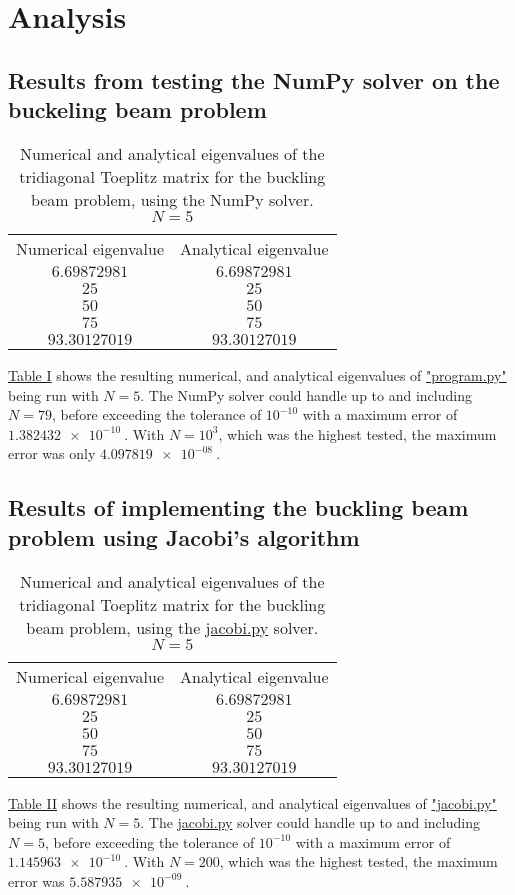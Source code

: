 \documentclass[english,notitlepage,reprint]{revtex4-1}  %
\begin{document}
\section{Analysis}\label{sec:4}
\subsection{Results from testing the NumPy solver on the buckeling beam problem}\label{subsec:41}
\begin{table}[H]
	\label{tab:411}
	\centering
	\begin{tabular}{|c|c|}
	Numerical eigenvalue & Analytical eigenvalue \\
	\(6.69872981\)	& \(6.69872981\) \\
	\(25\) & \(25\) \\
	\(50\) & \(50\) \\
	\(75\) & \(75\) \\
	\(93.30127019\) & \(93.30127019\) \\
	\end{tabular}
	\caption{Numerical and analytical eigenvalues of the tridiagonal Toeplitz matrix for
	the buckling beam problem, using the NumPy solver. \(N=5\)}
\end{table}

\hyperref[tab:411]{Table I} shows the resulting numerical, and analytical eigenvalues of \hyperref[A:1]{"program.py"} being run with \(N=5\). The NumPy solver could handle up to and including \(N=79\), before exceeding the tolerance of \(10^{-10}\) with a maximum error of \(\SI{1.382432e-10}{}\). With \(N=10^{3}\), which was the highest tested, the maximum error was only \(\SI{4.097819e-08}{}\).

\subsection{Results of implementing the buckling beam problem using Jacobi's algorithm}\label{subsec:42}
\begin{table}[H]
	\label{tab:421}
	\centering
	\begin{tabular}{|c|c|}
	Numerical eigenvalue & Analytical eigenvalue \\
	\(6.69872981\)	& \(6.69872981\) \\
	\(25\) & \(25\) \\
	\(50\) & \(50\) \\
	\(75\) & \(75\) \\
	\(93.30127019\) & \(93.30127019\) \\
	\end{tabular}
	\caption{Numerical and analytical eigenvalues of the tridiagonal Toeplitz matrix for
	the buckling beam problem, using the \hyperref[A:2]{jacobi.py} solver. \(N=5\)}
\end{table}
\hyperref[tab:421]{Table II} shows the resulting numerical, and analytical eigenvalues of \hyperref[A:2]{"jacobi.py"} being run with \(N=5\). The \hyperref[A:2]{jacobi.py} solver could handle up to and including \(N=5\), before exceeding the tolerance of \(10^{-10}\) with a maximum error of \(\SI{1.145963e-10}{}\). With \(N=200\), which was the highest tested, the maximum error was \(\SI{5.587935e-09}{}\).
\end{document}
